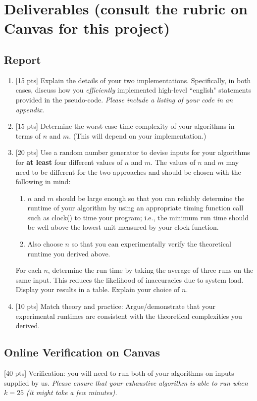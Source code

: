 \documentclass{article}
\begin{document}
\section{Deliverables (consult the rubric on Canvas for this project)}
\subsection{Report}
\begin{enumerate}

\item 

[15 pts] Explain the details of your two implementations. Specifically,
in both cases, discuss how you {\em efficiently} implemented high-level 
``english" statements provided in the pseudo-code. {\em Please include a 
listing of your code in an appendix.} 

\item

[15 pts] Determine the worst-case time complexity of your algorithms in
terms of $n$ and $m$. (This will depend on your implementation.) 

\item

[20 pts] Use a random number generator to devise inputs for 
your algorithms for {\bf at least} four different values of $n$ and $m$. The 
values of $n$ and $m$ may need to be different for the two approaches and 
should be chosen with the following in mind: 
\begin{enumerate}
\item $n$ and $m$ should be large enough so that you can reliably determine the 
runtime of your algorithm
by using an appropriate timing function call such as clock() to time your 
program; i.e., the minimum run time should be well above the lowest unit measured by your clock function.
\item Also choose $n$ so that you can experimentally verify the 
theoretical runtime you derived above. 
\end{enumerate}
For each $n$, determine the run time by taking the average of three runs on 
the same input. This reduces the likelihood of inaccuracies due to system load. 
Display your results in a table. Explain your choice of $n$.

\item

[10 pts] Match theory and practice: Argue/demonstrate that your experimental 
runtimes are consistent with the theoretical complexities you derived.

\end{enumerate}
\subsection{Online Verification on Canvas}
[40 pts] Verification: you will need to run both of your algorithms on inputs supplied by us.  {\em Please ensure that your exhaustive algorithm is able to run when $k=25$ (it might take a few minutes).}
\end{document}
